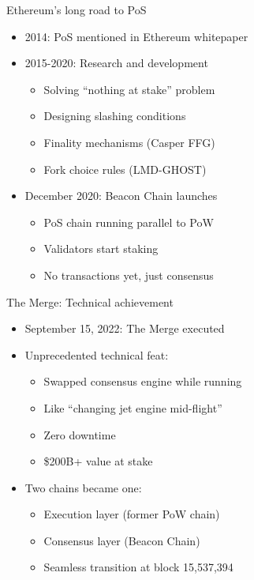 \documentclass[aspectratio=169, lualatex, handout]{beamer}
\begin{document}
\begin{frame}{Ethereum's long road to PoS}
	\begin{itemize}
		\item 2014: PoS mentioned in Ethereum whitepaper
		\item 2015-2020: Research and development
		      \begin{itemize}
			      \item Solving ``nothing at stake'' problem
			      \item Designing slashing conditions
			      \item Finality mechanisms (Casper FFG)
			      \item Fork choice rules (LMD-GHOST)
		      \end{itemize}
		\item December 2020: Beacon Chain launches
		      \begin{itemize}
			      \item PoS chain running parallel to PoW
			      \item Validators start staking
			      \item No transactions yet, just consensus
		      \end{itemize}
	\end{itemize}
\end{frame}

\begin{frame}{The Merge: Technical achievement}
	\begin{itemize}
		\item September 15, 2022: The Merge executed
		\item Unprecedented technical feat:
		      \begin{itemize}
			      \item Swapped consensus engine while running
			      \item Like ``changing jet engine mid-flight''
			      \item Zero downtime
			      \item \$200B+ value at stake
		      \end{itemize}
		\item Two chains became one:
		      \begin{itemize}
			      \item Execution layer (former PoW chain)
			      \item Consensus layer (Beacon Chain)
			      \item Seamless transition at block 15,537,394
		      \end{itemize}
	\end{itemize}
\end{frame}
\end{document}
